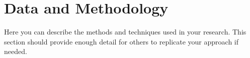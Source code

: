 

\section{Data and Methodology}
Here you can describe the methods and techniques used in your research. This section should provide enough detail for others to replicate your approach if needed.

